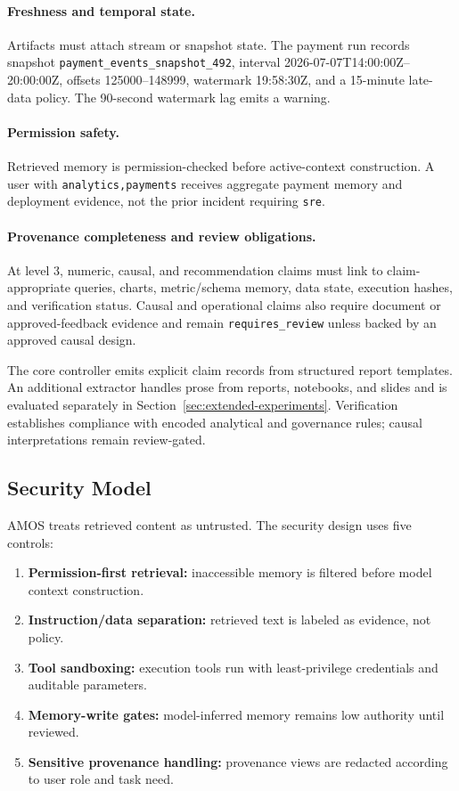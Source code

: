 \documentclass[10pt]{article}
\newcommand{\amos}{\textsc{AMOS}\xspace}
\newcommand{\code}[1]{\texttt{#1}}
\begin{document}
\paragraph{Freshness and temporal state.} Artifacts must attach stream or snapshot state. The payment run records snapshot \code{payment\_events\_snapshot\_492}, interval 2026-07-07T14:00:00Z--20:00:00Z, offsets 125000--148999, watermark 19:58:30Z, and a 15-minute late-data policy. The 90-second watermark lag emits a warning.

\paragraph{Permission safety.} Retrieved memory is permission-checked before active-context construction. A user with \code{analytics,payments} receives aggregate payment memory and deployment evidence, not the prior incident requiring \code{sre}.

\paragraph{Provenance completeness and review obligations.} At level 3, numeric, causal, and recommendation claims must link to claim-appropriate queries, charts, metric/schema memory, data state, execution hashes, and verification status. Causal and operational claims also require document or approved-feedback evidence and remain \code{requires\_review} unless backed by an approved causal design.

The core controller emits explicit claim records from structured report templates. An additional extractor handles prose from reports, notebooks, and slides and is evaluated separately in Section~\ref{sec:extended-experiments}. Verification establishes compliance with encoded analytical and governance rules; causal interpretations remain review-gated.

\subsection{Security Model}
\amos treats retrieved content as untrusted. The security design uses five controls:
\begin{enumerate}
    \item \textbf{Permission-first retrieval:} inaccessible memory is filtered before model context construction.
    \item \textbf{Instruction/data separation:} retrieved text is labeled as evidence, not policy.
    \item \textbf{Tool sandboxing:} execution tools run with least-privilege credentials and auditable parameters.
    \item \textbf{Memory-write gates:} model-inferred memory remains low authority until reviewed.
    \item \textbf{Sensitive provenance handling:} provenance views are redacted according to user role and task need.
\end{enumerate}
\end{document}
